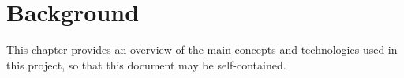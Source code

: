 
\chapter{Background}
\label{chapter:background}

This chapter provides an overview of the main concepts and technologies used in
this project, so that this document may be self-contained.


